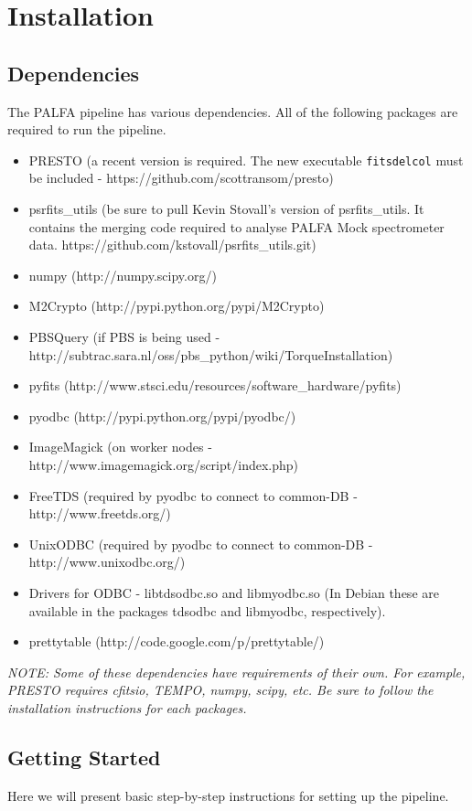 \documentclass[12pt]{article}
\begin{document}
\section{Installation}
\subsection{Dependencies}
The PALFA pipeline has various dependencies. All of the following packages are required to run the pipeline.
\begin{itemize}
    \item PRESTO (a recent version is required. The new executable \texttt{fitsdelcol} must be included - https://github.com/scottransom/presto)
    \item psrfits\_utils (be sure to pull Kevin Stovall's version of psrfits\_utils. It contains the merging code required to analyse PALFA Mock spectrometer data. https://github.com/kstovall/psrfits\_utils.git)
    \item numpy (http://numpy.scipy.org/)
    \item M2Crypto (http://pypi.python.org/pypi/M2Crypto)
    \item PBSQuery (if PBS is being used - http://subtrac.sara.nl/oss/pbs\_python/wiki/TorqueInstallation)
    \item pyfits (http://www.stsci.edu/resources/software\_hardware/pyfits)
    \item pyodbc (http://pypi.python.org/pypi/pyodbc/)
    \item ImageMagick (on worker nodes - http://www.imagemagick.org/script/index.php)
    \item FreeTDS (required by pyodbc to connect to common-DB - http://www.freetds.org/)
    \item UnixODBC (required by pyodbc to connect to common-DB - http://www.unixodbc.org/)
    \item Drivers for ODBC - libtdsodbc.so and libmyodbc.so (In Debian these are available in the packages tdsodbc and libmyodbc, respectively).
    \item prettytable (http://code.google.com/p/prettytable/)
\end{itemize}

\textit{NOTE: Some of these dependencies have requirements of their own. For example, PRESTO requires cfitsio, TEMPO, numpy, scipy, etc. Be sure to follow the installation instructions for each packages.}

\subsection{Getting Started}
Here we will present basic step-by-step instructions for setting up the pipeline.
\end{document}
